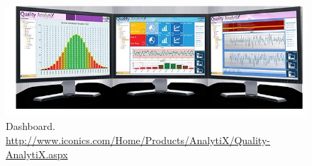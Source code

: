 \begin{figure}[h]
\centering
\includegraphics[height=0.3\textheight, width=0.9\linewidth]{art/dashboard}
\caption[Dashboard]{Dashboard. \newline
\url{http://www.iconics.com/Home/Products/AnalytiX/Quality-AnalytiX.aspx}}
\label{fig:dashboard}
\end{figure}

\afterpage{\clearpage}
